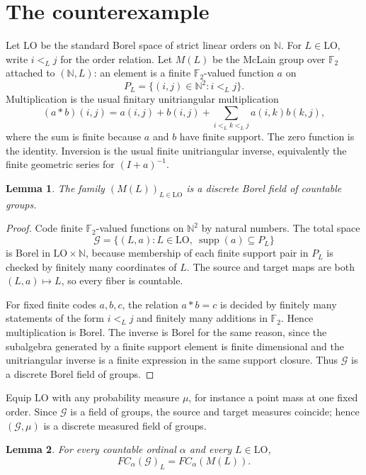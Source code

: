 \documentclass[11pt]{amsart}
\newtheorem{lemma}{Lemma}
\newcommand{\N}{\mathbb N}
\newcommand{\F}{\mathbb F}
\newcommand{\LO}{\mathrm{LO}}
\newcommand{\cG}{\mathcal G}
\newcommand{\supp}{\operatorname{supp}}
\begin{document}
\section{The counterexample}

Let \(\LO\) be the standard Borel space of strict linear orders on \(\N\).  For
\(L\in\LO\), write \(i<_L j\) for the order relation.  Let \(M(L)\) be the
McLain group over \(\F_2\) attached to \((\N,L)\): an element is a finite
\(\F_2\)-valued function \(a\) on
\[
  P_L=\{(i,j)\in\N^2:i<_Lj\}.
\]
Multiplication is the usual finitary unitriangular multiplication
\[
  (a*b)(i,j)
  =a(i,j)+b(i,j)+\sum_{i<_L k<_L j}a(i,k)b(k,j),
\]
where the sum is finite because \(a\) and \(b\) have finite support.  The zero
function is the identity.  Inversion is the usual finite unitriangular inverse,
equivalently the finite geometric series for \((I+a)^{-1}\).

\begin{lemma}\label{lem:borel-field}
The family \((M(L))_{L\in\LO}\) is a discrete Borel field of countable groups.
\end{lemma}

\begin{proof}
Code finite \(\F_2\)-valued functions on \(\N^2\) by natural numbers.  The
total space
\[
  \cG=\{(L,a): L\in\LO,\ \supp(a)\subseteq P_L\}
\]
is Borel in \(\LO\times\N\), because membership of each finite support pair in
\(P_L\) is checked by finitely many coordinates of \(L\).  The source and
target maps are both \((L,a)\mapsto L\), so every fiber is countable.

For fixed finite codes \(a,b,c\), the relation \(a*b=c\) is decided by finitely
many statements of the form \(i<_L j\) and finitely many additions in
\(\F_2\).  Hence multiplication is Borel.  The inverse is Borel for the same
reason, since the subalgebra generated by a finite support element is finite
dimensional and the unitriangular inverse is a finite expression in the same
support closure.  Thus \(\cG\) is a discrete Borel field of groups.
\end{proof}

Equip \(\LO\) with any probability measure \(\mu\), for instance a point mass
at one fixed order.  Since \(\cG\) is a field of groups, the source and target
measures coincide; hence \((\cG,\mu)\) is a discrete measured field of groups.

\begin{lemma}\label{lem:fiberwise}
For every countable ordinal \(\alpha\) and every \(L\in\LO\),
\[
  FC_\alpha(\cG)_L=FC_\alpha(M(L)).
\]
\end{lemma}
\end{document}
